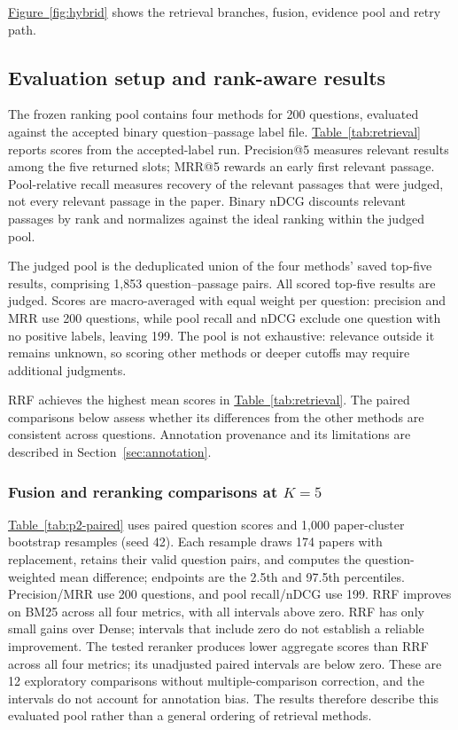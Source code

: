 \hyperref[fig:hybrid]{Figure~\ref*{fig:hybrid}} shows the retrieval branches, fusion, evidence pool and retry path.


\subsection{Evaluation setup and rank-aware results}

The frozen ranking pool contains four methods for 200 questions, evaluated against the accepted binary question--passage label file. \hyperref[tab:retrieval]{Table~\ref*{tab:retrieval}} reports scores from the accepted-label run. Precision@5 measures relevant results among the five returned slots; MRR@5 rewards an early first relevant passage. Pool-relative recall measures recovery of the relevant passages that were judged, not every relevant passage in the paper. Binary nDCG discounts relevant passages by rank and normalizes against the ideal ranking within the judged pool.

The judged pool is the deduplicated union of the four methods' saved top-five results, comprising 1,853 question--passage pairs. All scored top-five results are judged. Scores are macro-averaged with equal weight per question: precision and MRR use 200 questions, while pool recall and nDCG exclude one question with no positive labels, leaving 199. The pool is not exhaustive: relevance outside it remains unknown, so scoring other methods or deeper cutoffs may require additional judgments.

RRF achieves the highest mean scores in \hyperref[tab:retrieval]{Table~\ref*{tab:retrieval}}. The paired comparisons below assess whether its differences from the other methods are consistent across questions. Annotation provenance and its limitations are described in Section~\ref{sec:annotation}.

\subsubsection{Fusion and reranking comparisons at \texorpdfstring{$K=5$}{K=5}}

\hyperref[tab:p2-paired]{Table~\ref*{tab:p2-paired}} uses paired question scores and 1,000 paper-cluster bootstrap resamples (seed 42). Each resample draws 174 papers with replacement, retains their valid question pairs, and computes the question-weighted mean difference; endpoints are the 2.5th and 97.5th percentiles. Precision/MRR use 200 questions, and pool recall/nDCG use 199. RRF improves on BM25 across all four metrics, with all intervals above zero. RRF has only small gains over Dense; intervals that include zero do not establish a reliable improvement. The tested reranker produces lower aggregate scores than RRF across all four metrics; its unadjusted paired intervals are below zero. These are 12 exploratory comparisons without multiple-comparison correction, and the intervals do not account for annotation bias. The results therefore describe this evaluated pool rather than a general ordering of retrieval methods.

